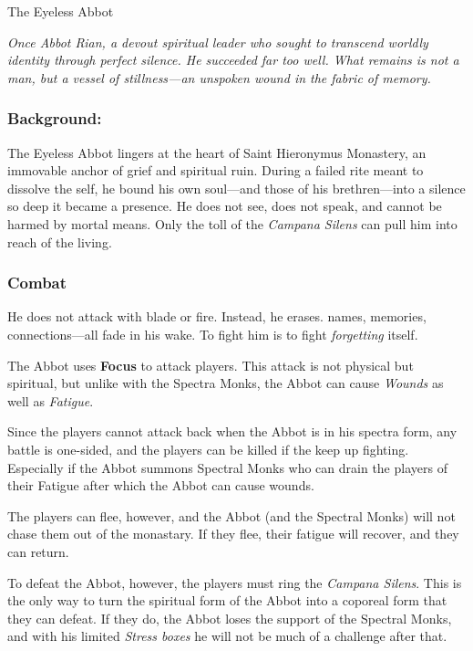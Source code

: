 \documentclass[nodeprecatedcode,bg=print]{dndbook/dndbook}
\begin{document}
\begin{WyrdFullNPC}[%
    name=The Eyeless Abbot,%
    description=Silence Incarnate,%
    float=!t%
  ]{The Eyeless Abbot}
  
  \emph{Once Abbot Rian, a devout spiritual leader who sought to transcend worldly identity through perfect silence. He succeeded far too well. What remains is not a man, but a vessel of stillness—an unspoken wound in the fabric of memory.}
  
  \subsubsection*{Background:}
  The Eyeless Abbot lingers at the heart of Saint Hieronymus Monastery, an immovable anchor of grief and spiritual ruin. During a failed rite meant to dissolve the self, he bound his own soul—and those of his brethren—into a silence so deep it became a presence. He does not see, does not speak, and cannot be harmed by mortal means. Only the toll of the \emph{Campana Silens} can pull him into reach of the living.
  
  \subsubsection*{Combat}
  He does not attack with blade or fire. Instead, he erases. names, memories, connections—all fade in his wake. To fight him is to fight \emph{forgetting} itself.

  The Abbot uses \textbf{Focus} to attack players. This attack is not physical but spiritual, but unlike with the Spectra Monks, the Abbot can cause \emph{Wounds} as well as \emph{Fatigue}.

  Since the players cannot attack back when the Abbot is in his spectra form, any battle is one-sided, and the players can be killed if the keep up fighting. Especially if the Abbot summons Spectral Monks who can drain the players of their Fatigue after which the Abbot can cause wounds.

  The players can flee, however, and the Abbot (and the Spectral Monks) will not chase them out of the monastary. If they flee, their fatigue will recover, and they can return.

  To defeat the Abbot, however, the players must ring the \emph{Campana Silens}. This is the only way to turn the spiritual form of the Abbot into a coporeal form that they can defeat. If they do, the Abbot loses the support of the Spectral Monks, and with his limited \emph{Stress boxes} he will not be much of a challenge after that.
  

\end{WyrdFullNPC}
\end{document}
